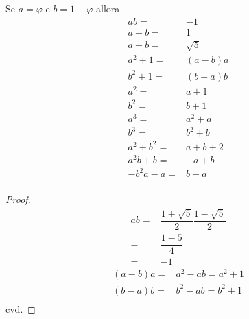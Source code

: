 \begin{lem}[Proprietà]\label{lem:FibpropPhi}
	Se $a=\varphi$ e  $b=1-\varphi$ allora
	\begin{align*}
		ab={}      & -1       \\
		a+b={}     & 1        \\
		a-b={}     & \sqrt{5} \\
		a^2+1={}   & (a-b)a   \\
		b^2+1={}   & (b-a)b   \\
		a^2={}     & a+1      \\
		b^2={}     & b+1      \\
		a^3={}     & a^2+a    \\
		b^3={}     & b^2+b    \\
		a^2+b^2={} & a+b+2    \\
		a^2b+b={}  & -a+b     \\
		-b^2a-a={} & b-a      \\
	\end{align*}
\end{lem}
\begin{proof}
	\begin{align*}
		ab={} & \dfrac{1+\sqrt{5}}{2}\dfrac{1-\sqrt{5}}{2} \\
		={}   & \dfrac{1-5}{4}                             \\
		={}   & -1
	\end{align*}
	\begin{align*}
		(a-b)a={} & a^2-ab=a^2+1 \\
		(b-a)b={} & b^2-ab=b^2+1 \\
	\end{align*}
	cvd.
\end{proof}
